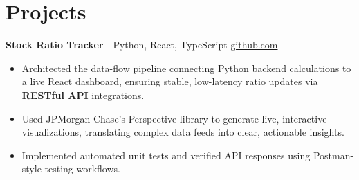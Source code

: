 \documentclass[11pt]{article}       %
\begin{document}
\vspace{-18.5pt}

\section*{Projects}

\textbf{Stock Ratio Tracker}{ - Python, React, TypeScript} \hfill \href{https://github.com/Monica20030707/Trading-Dashboard_UI}{github.com} \\
\vspace{-9pt}
\begin{itemize}
  \item Architected the data-flow pipeline connecting Python backend calculations to a live React dashboard, ensuring stable, low-latency ratio updates via \textbf{RESTful API} integrations. 
  \item Used JPMorgan Chase's Perspective library to generate live, interactive visualizations, translating complex data feeds into clear, actionable insights.
  \item Implemented automated unit tests and verified API responses using Postman-style testing workflows.
\end{itemize}

\end{document}
